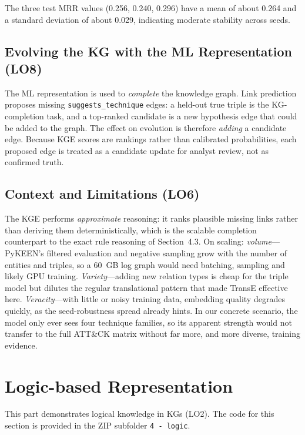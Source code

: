 \documentclass{article}
\begin{document}
The three test MRR values (0.256, 0.240, 0.296) have a mean of about 0.264 and a
standard deviation of about 0.029, indicating moderate stability across seeds.

\subsection{Evolving the KG with the ML Representation (LO8)}
The ML representation is used to \emph{complete} the knowledge graph. Link
prediction proposes missing \texttt{suggests\_technique} edges: a held-out true
triple is the KG-completion task, and a top-ranked candidate is a new hypothesis
edge that could be added to the graph. The effect on evolution is therefore
\emph{adding} a candidate edge. Because KGE scores are rankings rather than
calibrated probabilities, each proposed edge is treated as a candidate update
for analyst review, not as confirmed truth.

\subsection{Context and Limitations (LO6)}
The KGE performs \emph{approximate} reasoning: it ranks plausible missing links
rather than deriving them deterministically, which is the scalable
completion counterpart to the exact rule reasoning of Section~4.3. On scaling:
\emph{volume}---PyKEEN's filtered evaluation and negative sampling grow with the
number of entities and triples, so a 60~GB log graph would need batching,
sampling and likely GPU training. \emph{Variety}---adding new relation types is
cheap for the triple model but dilutes the regular translational pattern that
made TransE effective here. \emph{Veracity}---with little or noisy training data,
embedding quality degrades quickly, as the seed-robustness spread already hints.
In our concrete scenario, the model only ever sees four technique families, so
its apparent strength would not transfer to the full ATT\&CK matrix without far
more, and more diverse, training evidence.

\section{Logic-based Representation}
This part demonstrates logical knowledge in KGs (LO2). The code for this section
is provided in the ZIP subfolder \texttt{4 - logic}.
\end{document}
